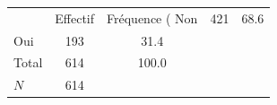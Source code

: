 {
\def\sym#1{\ifmmode^{#1}\else\(^{#1}\)\fi}
\begin{tabular}{l*{1}{cc}}
\toprule
            &    Effectif&Fréquence (%
\midrule
Non         &         421&        68.6\\
Oui         &         193&        31.4\\
Total       &         614&       100.0\\
\midrule
\(N\)       &         614&            \\
\bottomrule
\end{tabular}
}

